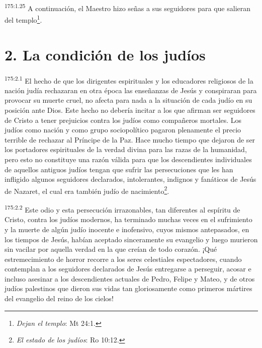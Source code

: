 \par 
\textsuperscript{175:1.25} A continuación, el Maestro hizo señas a sus seguidores para que salieran del templo\footnote{\textit{Dejan el templo}: Mt 24:1.}.

\section*{2. La condición de los judíos}
\par 
\textsuperscript{175:2.1} El hecho de que los dirigentes espirituales y los educadores religiosos de la nación judía rechazaran en otra época las enseñanzas de Jesús y conspiraran para provocar su muerte cruel, no afecta para nada a la situación de cada judío en su posición ante Dios. Este hecho no debería incitar a los que afirman ser seguidores de Cristo a tener prejuicios contra los judíos como compañeros mortales. Los judíos como nación y como grupo sociopolítico pagaron plenamente el precio terrible de rechazar al Príncipe de la Paz. Hace mucho tiempo que dejaron de ser los portadores espirituales de la verdad divina para las razas de la humanidad, pero esto no constituye una razón válida para que los descendientes individuales de aquellos antiguos judíos tengan que sufrir las persecuciones que les han infligido algunos seguidores declarados, intolerantes, indignos y fanáticos de Jesús de Nazaret, el cual era también judío de nacimiento\footnote{\textit{El estado de los judíos}: Ro 10:12.}.

\par 
\textsuperscript{175:2.2} Este odio y esta persecución irrazonables, tan diferentes al espíritu de Cristo, contra los judíos modernos, ha terminado muchas veces en el sufrimiento y la muerte de algún judío inocente e inofensivo, cuyos mismos antepasados, en los tiempos de Jesús, habían aceptado sinceramente su evangelio y luego murieron sin vacilar por aquella verdad en la que creían de todo corazón. ¡Qué estremecimiento de horror recorre a los seres celestiales espectadores, cuando contemplan a los seguidores declarados de Jesús entregarse a perseguir, acosar e incluso asesinar a los descendientes actuales de Pedro, Felipe y Mateo, y de otros judíos palestinos que dieron sus vidas tan gloriosamente como primeros mártires del evangelio del reino de los cielos!

